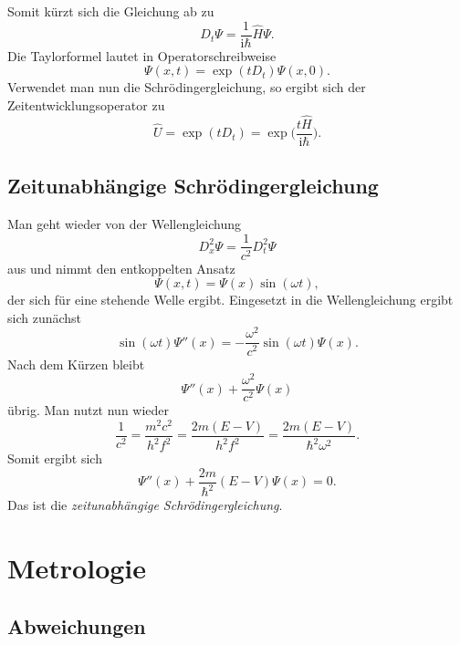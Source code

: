 \documentclass[a4paper,10pt,fleqn,twocolumn,twoside]{scrartcl}
\numberwithin{equation}{section}
\newcommand{\ui}{\mathrm i}
\begin{document}
Somit kürzt sich die Gleichung ab zu
\begin{equation}
D_t\Psi = \frac{1}{\ui\hbar}\hat H\Psi.
\end{equation}
Die Taylorformel lautet in Operatorschreibweise
\begin{equation}
\Psi(x,t)=\exp(tD_t)\Psi(x,0).
\end{equation}
Verwendet man nun die Schrödingergleichung, so ergibt sich
der Zeitentwicklungsoperator zu
\begin{equation}
\hat U = \exp(tD_t) = \exp\Big(\frac{t\hat H}{\ui\hbar}\Big).
\end{equation}

\subsection[Zeitunabhängige Schrödingergleichung]
{Zeitunabhängige\newline
Schrödingergleichung}

Man geht wieder von der Wellengleichung
\begin{equation}
D_x^2\Psi=\frac{1}{c^2}D_t^2\Psi
\end{equation}
aus und nimmt den entkoppelten Ansatz
\begin{equation}
\Psi(x,t)=\Psi(x)\sin(\omega t),
\end{equation}
der sich für eine stehende Welle ergibt. Eingesetzt in
die Wellengleichung ergibt sich zunächst
\begin{equation}
\sin(\omega t)\Psi''(x)=-\frac{\omega^2}{c^2}\sin(\omega t)\Psi(x).
\end{equation}
Nach dem Kürzen bleibt
\begin{equation}
\Psi''(x) + \frac{\omega^2}{c^2}\Psi(x)
\end{equation}
übrig. Man nutzt nun wieder
\begin{equation}
\frac{1}{c^2} = \frac{m^2 c^2}{h^2 f^2}
= \frac{2m(E-V)}{h^2 f^2}
= \frac{2m(E-V)}{\hbar^2 \omega^2}.
\end{equation}
Somit ergibt sich
\begin{equation}
\Psi''(x) + \frac{2m}{\hbar^2}(E-V)\Psi(x) = 0.
\end{equation}
Das ist die \emph{zeitunabhängige Schrödingergleichung}.

\newpage
\section{Metrologie}
\subsection{Abweichungen}
\end{document}
